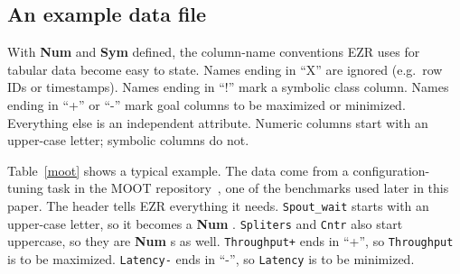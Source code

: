 \documentclass[AMA,STIX2COL]{WileyNJDv5}
\newcommand{\IT}{{\sffamily EZR}}
\newcommand{\cls}[1]{%
  \setlength{\fboxsep}{1.5pt}%
  \colorbox{clsbg}{\sffamily\bfseries{#1}}%
}
\begin{document}
{\subsection{An example data file}\label{details}

With \cls{Num} and \cls{Sym} defined, the column-name
conventions \IT{} uses for tabular data become easy to state.
Names ending in ``X'' are ignored (e.g.\ row IDs or timestamps).
Names ending in ``!'' mark a symbolic class column. Names
ending in ``+'' or ``-'' mark goal columns to be maximized or
minimized. Everything else is an independent attribute. Numeric
columns start with an upper-case letter; symbolic columns do
not.

Table~\ref{moot} shows a typical example. The data come from a
configuration-tuning task in the MOOT
repository~\cite{menzies2025moot}, one of the benchmarks used
later in this paper. The header tells \IT{} everything it
needs. \texttt{Spout\_wait} starts with an upper-case letter, so
it becomes a \cls{Num}. \texttt{Spliters} and \texttt{Cntr} also
start uppercase, so they are \cls{Num}s as well.
\texttt{Throughput+} ends in ``+'', so \texttt{Throughput} is to
be maximized. \texttt{Latency-} ends in ``-'', so
\texttt{Latency} is to be minimized.

}
\end{document}
